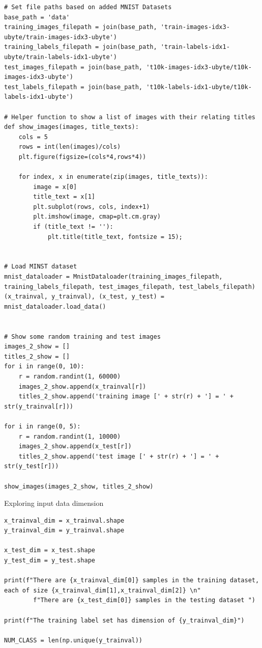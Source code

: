 \documentclass[a4paper]{article}
\begin{document}
\begin{lstlisting}
# Set file paths based on added MNIST Datasets
base_path = 'data'
training_images_filepath = join(base_path, 'train-images-idx3-ubyte/train-images-idx3-ubyte')
training_labels_filepath = join(base_path, 'train-labels-idx1-ubyte/train-labels-idx1-ubyte')
test_images_filepath = join(base_path, 't10k-images-idx3-ubyte/t10k-images-idx3-ubyte')
test_labels_filepath = join(base_path, 't10k-labels-idx1-ubyte/t10k-labels-idx1-ubyte')

# Helper function to show a list of images with their relating titles
def show_images(images, title_texts):
    cols = 5
    rows = int(len(images)/cols)
    plt.figure(figsize=(cols*4,rows*4))
    
    for index, x in enumerate(zip(images, title_texts)):        
        image = x[0]        
        title_text = x[1]
        plt.subplot(rows, cols, index+1)        
        plt.imshow(image, cmap=plt.cm.gray)
        if (title_text != ''):
            plt.title(title_text, fontsize = 15);        


# Load MINST dataset
mnist_dataloader = MnistDataloader(training_images_filepath, training_labels_filepath, test_images_filepath, test_labels_filepath)
(x_trainval, y_trainval), (x_test, y_test) = mnist_dataloader.load_data()


# Show some random training and test images 
images_2_show = []
titles_2_show = []
for i in range(0, 10):
    r = random.randint(1, 60000)
    images_2_show.append(x_trainval[r])
    titles_2_show.append('training image [' + str(r) + '] = ' + str(y_trainval[r]))    

for i in range(0, 5):
    r = random.randint(1, 10000)
    images_2_show.append(x_test[r])        
    titles_2_show.append('test image [' + str(r) + '] = ' + str(y_test[r]))    

show_images(images_2_show, titles_2_show)
\end{lstlisting}

Exploring input data dimension

\begin{lstlisting}
x_trainval_dim = x_trainval.shape
y_trainval_dim = y_trainval.shape

x_test_dim = x_test.shape
y_test_dim = y_test.shape

print(f"There are {x_trainval_dim[0]} samples in the training dataset, each of size {x_trainval_dim[1],x_trainval_dim[2]} \n"
        f"There are {x_test_dim[0]} samples in the testing dataset ")

print(f"The training label set has dimension of {y_trainval_dim}")

NUM_CLASS = len(np.unique(y_trainval))
\end{lstlisting}
\end{document}
